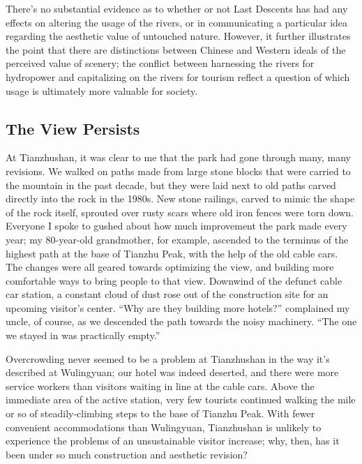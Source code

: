 There's no substantial evidence as to whether or not Last Descents has had any
effects on altering the usage of the rivers, or in communicating a particular
idea regarding the aesthetic value of untouched nature. However, it further
illustrates the point that there are distinctions between Chinese and Western
ideals of the perceived value of scenery; the conflict between harnessing the
rivers for hydropower and capitalizing on the rivers for tourism reflect a
question of which usage is ultimately more valuable for society.

\subsection*{The View Persists}

At Tianzhushan, it was clear to me that the park had gone through many, many
revisions. We walked on paths made from large stone blocks that were carried to
the mountain in the past decade, but they were laid next to old paths carved
directly into the rock in the 1980s. New stone railings, carved to mimic the
shape of the rock itself, sprouted over rusty scars where old iron fences were
torn down. Everyone I spoke to gushed about how much improvement the park made
every year; my 80-year-old grandmother, for example, ascended to the terminus of
the highest path at the base of Tianzhu Peak, with the help of the old cable
cars. The changes were all geared towards optimizing the view, and building more
comfortable ways to bring people to that view. Downwind of the defunct cable car
station, a constant cloud of dust rose out of the construction site for an
upcoming visitor's center. ``Why are they building more hotels?'' complained my
uncle, of course, as we descended the path towards the noisy machinery. ``The
one we stayed in was practically empty.''

Overcrowding never seemed to be a problem at Tianzhushan in the way it's
described at Wulingyuan; our hotel was indeed deserted, and there were more
service workers than visitors waiting in line at the cable cars. Above the
immediate area of the active station, very few tourists continued walking the
mile or so of steadily-climbing steps to the base of Tianzhu Peak. With fewer
convenient accommodations than Wulingyuan, Tianzhushan is unlikely to experience
the problems of an unsustainable visitor increase; why, then, has it been under
so much construction and aesthetic revision?

